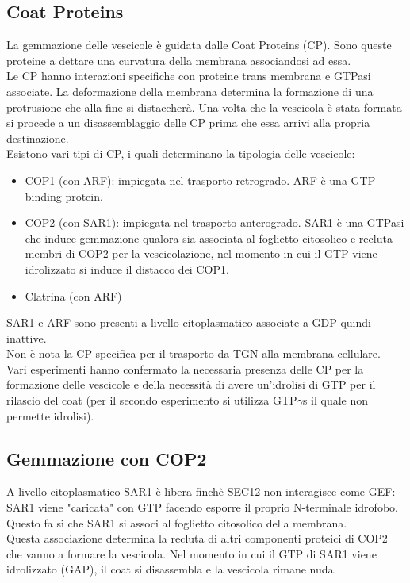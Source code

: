     \subsection{Coat Proteins}
        La gemmazione delle vescicole è guidata dalle Coat Proteins (CP). Sono queste proteine a dettare una curvatura della membrana associandosi ad essa.\\
        Le CP hanno interazioni specifiche con proteine trans membrana e GTPasi associate. La deformazione della membrana determina la formazione di una protrusione che alla fine si distaccherà.
        Una volta che la vescicola è stata formata si procede a un disassemblaggio delle CP prima che essa arrivi alla propria destinazione.\\
        Esistono vari tipi di CP, i quali determinano la tipologia delle vescicole:
        \begin{itemize}
            \item COP1 (con ARF): impiegata nel trasporto retrogrado. ARF è una GTP binding-protein.
            \item COP2 (con SAR1): impiegata nel trasporto anterogrado. SAR1 è una GTPasi che induce gemmazione qualora sia associata al foglietto citosolico e recluta membri di COP2 per la vescicolazione, nel momento in cui il GTP viene idrolizzato si induce il distacco dei COP1.
            \item Clatrina (con ARF)
        \end{itemize}
        SAR1 e ARF sono presenti a livello citoplasmatico associate a GDP quindi inattive.\\
        Non è nota la CP specifica per il trasporto da TGN alla membrana cellulare.\\
        Vari esperimenti hanno confermato la necessaria presenza delle CP per la formazione delle vescicole e della necessità di avere un'idrolisi di GTP per il rilascio del coat (per il secondo esperimento si utilizza GTP$\gamma$s il quale non permette idrolisi).
        
    \subsection{Gemmazione con COP2}
        A livello citoplasmatico SAR1 è libera finchè SEC12 non interagisce come GEF: SAR1 viene "caricata" con GTP facendo esporre il proprio N-terminale idrofobo. Questo fa sì che SAR1 si associ al foglietto citosolico della membrana. \\
        Questa associazione determina la recluta di altri componenti proteici di COP2 che vanno a formare la vescicola. Nel momento in cui il GTP di SAR1 viene idrolizzato (GAP), il coat si disassembla e la vescicola rimane nuda.
        
